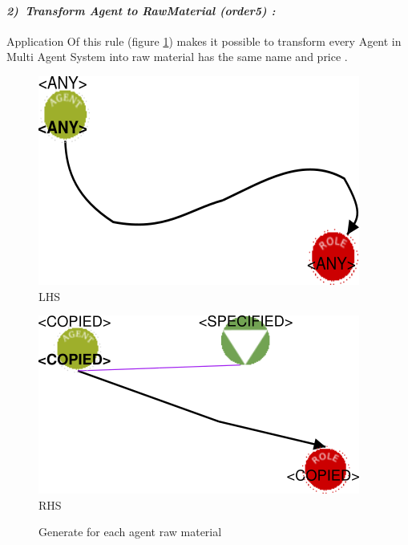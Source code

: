 \paragraph{\emph{2)~Transform Agent to RawMaterial (order5) :} }
 
 
Application Of this rule (figure \ref{fig:Generate for each agent raw material}) 
makes it possible to transform  every Agent in Multi Agent System into raw material 
has the same name and price  .
\vspace{1cm}
\begin{figure}[th]
\centering
\begin{minipage}{.4\textwidth}
  \begin{center}
  \includegraphics[width=.8\linewidth]{chapiter3/img/L2}
  LHS
  \end{center}
  
\end{minipage}%
\begin{minipage}{.5\textwidth}
  \begin{center}
  \includegraphics[width=.8\linewidth]{chapiter3/img/R2}
  RHS 
  \end{center}
\end{minipage}
\caption{\label{fig:Generate for each agent raw material}Generate for each agent raw material} 
\end{figure}
\vspace{1cm}

